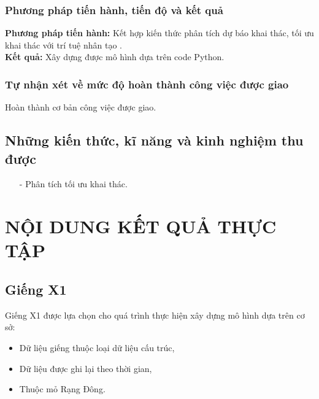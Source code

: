 \documentclass[12pt,a4paper]{report}
\begin{document}
\subsection{Phương pháp tiến hành, tiến độ và kết quả}
\textbf{Phương pháp tiến hành:} Kết hợp kiến thức phân tích dự báo khai thác, tối ưu khai thác với trí tuệ nhân tạo .\\
\textbf{Kết quả:} Xây dựng được mô hình dựa trên code Python.
\subsection{Tự nhận xét về mức độ hoàn thành công việc được giao}
Hoàn thành cơ bản công việc được giao.
\section{Những kiến thức, kĩ năng và kinh nghiệm thu được}
	\begin{itemize}
    	\item[-] Phân tích tối ưu khai thác.
    \end{itemize}
\chapter{NỘI DUNG KẾT QUẢ THỰC TẬP}
\section{Giếng X1}
Giếng X1 được lựa chọn cho quá trình thực hiện xây dựng mô hình dựa trên cơ sở:
    \begin{itemize}
        \item Dữ liệu giếng thuộc loại dữ liệu cấu trúc,
        \item Dữ liệu được ghi lại theo thời gian,
        \item Thuộc mỏ Rạng Đông.
    \end{itemize}
\end{document}
